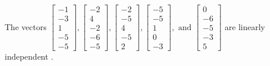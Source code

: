 \begin{exercise}
\begin{exerciseStatement}
  \end{exerciseStatement}
  \begin{exerciseAnswer}
   The vectors \(\left[\begin{array}{r}
-1 \\
-3 \\
1 \\
-5 \\
-5
\end{array}\right] , \left[\begin{array}{r}
-2 \\
4 \\
-2 \\
-6 \\
-5
\end{array}\right] , \left[\begin{array}{r}
-2 \\
-5 \\
4 \\
-5 \\
2
\end{array}\right] , \left[\begin{array}{r}
-5 \\
-5 \\
1 \\
0 \\
-3
\end{array}\right] , \text{ and } \left[\begin{array}{r}
0 \\
-6 \\
-5 \\
-3 \\
5
\end{array}\right]\) are 
  	 linearly independent  .
  


  \end{exerciseAnswer}
\end{exercise}